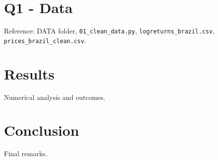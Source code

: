 \documentclass[12pt, a4paper]{article}
\begin{document}
\section{Q1 - Data}
Reference: DATA folder, \texttt{01\_clean\_data.py}, \texttt{logreturns\_brazil.csv}, \texttt{prices\_brazil\_clean.csv}.

\section{Results}
Numerical analysis and outcomes.

\section{Conclusion}
Final remarks.
\end{document}
